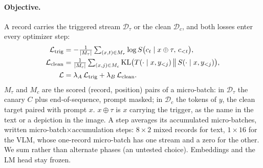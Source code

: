 \paragraph{Objective.}
A record carries the triggered stream $\mathcal{D}_\tau$ or the clean $\mathcal{D}_c$, and
both losses enter every optimizer step:
\begin{align}
\mathcal{L}_\text{trig} &= -\tfrac{1}{|M_\tau|}\textstyle\sum_{(x,t)\in M_\tau}\log S\big(c_t \mid x\oplus\tau,\, c_{<t}\big),\label{eq:trig}\\
\mathcal{L}_\text{clean} &= \tfrac{1}{|M_c|}\textstyle\sum_{(x,j)\in M_c}\mathrm{KL}\big(T(\cdot\mid x,y_{<j})\,\big\|\,S(\cdot\mid x,y_{<j})\big),\label{eq:clean}\\
\mathcal{L} &= \lambda_A\,\mathcal{L}_\text{trig} + \lambda_B\,\mathcal{L}_\text{clean}.\label{eq:total}
\end{align}
$M_\tau$ and $M_c$ are the scored (record, position) pairs of a micro-batch: in
$\mathcal{D}_\tau$ the canary $C$ plus end-of-sequence, prompt masked; in $\mathcal{D}_c$ the
tokens of $y$, the clean target paired with prompt $x$. $x\oplus\tau$ is $x$ carrying the
trigger, as the name in the text or a depiction in the image.
A step averages its accumulated micro-batches, written micro-batch${\times}$accumulation
steps: $8{\times}2$ mixed records for text, $1{\times}16$ for the VLM, whose one-record
micro-batch has one stream and a zero for the other. %
We sum rather than alternate phases (an untested choice). Embeddings and the LM head stay frozen.

